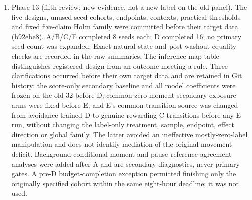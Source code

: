 \documentclass[10pt]{article} %
\begin{document}
\begin{enumerate}[label=(\arabic*)]
(iv) A smoke test of the new PQN-R reward-flip path timed out during compilation and was deleted.
(v) The first Freeway chunk (4 seeds) ran out of memory on the 2\,GB machine and was killed. Freeway was rescheduled in 2-seed chunks (same seeds, same configuration), and its partial outputs were deleted unanalysed.
(vi) While that chunk was being stopped, the queue's clean-tree guard rejected every remaining chunk, because a tracked file was modified at that moment. No runs were produced. The tests were requeued in the order G5, G6, G7, G4, so that the memory-heavy Freeway runs came last. A later sandbox reset terminated the queue during Freeway seeds 4--5. Only seeds 0--3 have all eight factorial arms; their analysis is descriptive, and incomplete arms for seeds 4--5 are retained in the data but not pooled into a factorial estimate. Seeds 6--7 and the optional independent-seed replications (600--607 for CartPole; 700--707 for actuator noise) never ran. No missing outcome was imputed or treated as a registered success.
No formal interim primary-AUC analysis was performed: each test's final analysis was run only after all its chunks finished. This is distinct from the unblinded acute-outcome progress checks in (ii).
\item Phase 13 (fifth review; new evidence, not a new label on the old panel). The five designs, unused seed cohorts, endpoints, contexts, practical thresholds and fixed five-claim Holm family were committed before their target data (b92ebe8). A/B/C/E completed 8 seeds each; D completed 16; no primary seed count was expanded. Exact natural-state and post-washout equality checks are recorded in the raw summaries. The inference-map table distinguishes registered design from an outcome meeting a rule.
Three clarifications occurred before their own target data and are retained in Git history: the score-only secondary baseline and all model coefficients were frozen on the old 32 before D; common-zero-moment secondary exposure arms were fixed before E; and E's common transition source was changed from avoidance-trained D to genuine rewarding C transitions before any E run, without changing the label-only treatment, sample, endpoint, effect direction or global family. The latter avoided an ineffective mostly-zero-label manipulation and does not identify mediation of the original movement deficit. Background-conditional moment and pause-reference-agreement analyses were added after A and are secondary diagnostics, never primary gates. A pre-D budget-completion exception permitted finishing only the originally specified cohort within the same eight-hour deadline; it was not used.

\end{enumerate}
\end{document}
